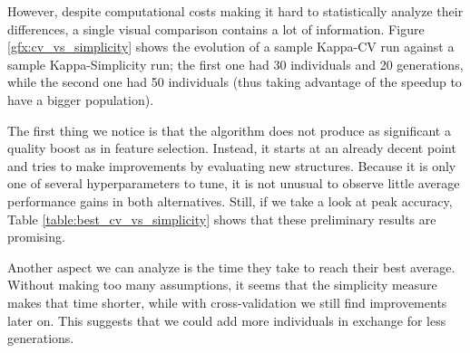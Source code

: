 	However, despite computational costs making it hard to statistically analyze their differences, a single visual comparison contains a lot of information. Figure \ref{gfx:cv_vs_simplicity} shows the evolution of a sample Kappa-CV run against a sample Kappa-Simplicity run; the first one had 30 individuals and 20 generations, while the second one had 50 individuals (thus taking advantage of the speedup to have a bigger population).

	The first thing we notice is that the algorithm does not produce as significant a quality boost as in feature selection. Instead, it starts at an already decent point and tries to make improvements by evaluating new structures. Because it is only one of several hyperparameters to tune, it is not unusual to observe little average performance gains in both alternatives. Still, if we take a look at peak accuracy, Table \ref{table:best_cv_vs_simplicity} shows that these preliminary results are promising.

	Another aspect we can analyze is the time they take to reach their best average. Without making too many assumptions, it seems that the simplicity measure makes that time shorter, while with cross-validation we still find improvements later on. This suggests that we could add more individuals in exchange for less generations.

\newpage

